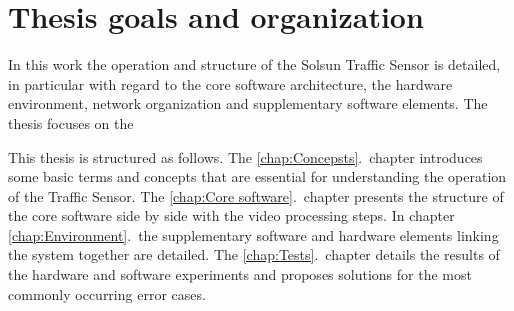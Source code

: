 \section{Thesis goals and organization}
In this work the operation and structure of the Solsun Traffic Sensor is detailed, in particular with regard to the core software architecture, the hardware environment, network organization and supplementary software elements.
The thesis focuses on the 

This thesis is structured as follows.
The \ref{chap:Concepsts}.~chapter introduces some basic terms and concepts that are essential for understanding the operation of the Traffic Sensor. 
The \ref{chap:Core software}.~chapter presents the structure of the core software side by side with the video processing steps.
In chapter \ref{chap:Environment}.~the supplementary software and hardware elements linking the system together are detailed.
The \ref{chap:Tests}.~chapter details the results of the hardware and software experiments and proposes solutions for the most commonly occurring error cases.
